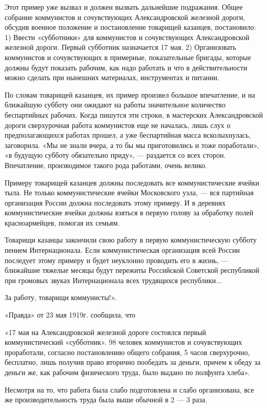 \documentclass[12pt]{article}
\newcommand{\parnum}{(\arabic{parcount})}
\newcounter{parcount}
\newenvironment{parnumbers}{%
  \par%
  \everypar{\noindent \stepcounter{parcount}\marginpar[]{\parnum}}%
}{}
\begin{document}
\begin{parnumbers}
Этот пример уже вызвал и должен вызвать дальнейшие подражания. Общее собрание коммунистов и сочувствующих Александровской железной дороги, обсудив военное положение и постановление товарищей казанцев, постановило: 1) Ввести «субботники» для коммунистов и сочувствующих Александровской железной дороги. Первый субботник назначается 17 мая. 2) Организовать коммунистов и сочувствующих в примерные, показательные бригады, которые должны будут показать рабочим, как надо работать и что в действительности можно сделать при нынешних материалах, инструментах и питании.

По словам товарищей казанцев, их пример произвел большое впечатление, и на ближайшую субботу они ожидают на работы значительное количество беспартийных рабочих. Когда пишутся эти строки, в мастерских Александровской дороги сверхурочная работа коммунистов еще не началась, лишь слух о предполагающихся работах прошел, а уже беспартийная масса всколыхнулась, заговорила. «Мы не знали вчера, а то бы мы приготовились и тоже поработали», «в будущую субботу обязательно приду», — раздается со всех сторон. Впечатление, производимое такого рода работами, очень велико.

Примеру товарищей казанцев должны последовать все коммунистические ячейки тыла. Не только коммунистические ячейки Московского узла, — вся партийная организация России должна последовать этому примеру. И в деревнях коммунистические ячейки должны взяться в первую голову за обработку полей красноармейцев, помогая их семьям.

Товарищи казанцы закончили свою работу в первую коммунистическую субботу пением Интернационала. Если коммунистическая организация всей России последует этому примеру и будет неуклонно проводить его в жизнь, — ближайшие тяжелые месяцы будут пережиты Российской Советской республикой при громовых звуках Интернационала всех трудящихся республики...

За работу, товарищи коммунисты!».

«Правда» от 23 мая 1919г. сообщила, что

«17 мая на Александровской железной дороге состоялся первый коммунистический «субботник». 98 человек коммунистов и сочувствующих проработали, согласно постановлению общего собрания, 5 часов сверхурочно, бесплатно, лишь получив право вторично пообедать за деньги, причем к обеду за деньги же, как рабочим физического труда, было выдано по полфунта хлеба».

Несмотря на то, что работа была слабо подготовлена и слабо организована, все же производительность труда была выше обычной в 2 — 3 раза.


\end{parnumbers}
\end{document}
